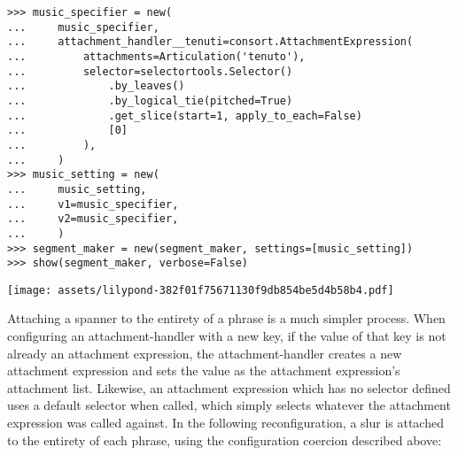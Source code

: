 \begin{comment}
<abjad>[stylesheet=../consort.ily]
music_specifier = new(
    music_specifier,
    attachment_handler__tenuti=consort.AttachmentExpression(
        attachments=Articulation('tenuto'),
        selector=selectortools.Selector()
            .by_leaves()
            .by_logical_tie(pitched=True)
            .get_slice(start=1, apply_to_each=False)
            [0]
        ),
    )
music_setting = new(
    music_setting,
    v1=music_specifier,
    v2=music_specifier,
    )
segment_maker = new(segment_maker, settings=[music_setting])
show(segment_maker, verbose=False)
</abjad>
\end{comment}

\begin{abjadbookoutput}
\begin{singlespacing}
\vspace{-0.5\baselineskip}
\begin{verbatim}
>>> music_specifier = new(
...     music_specifier,
...     attachment_handler__tenuti=consort.AttachmentExpression(
...         attachments=Articulation('tenuto'),
...         selector=selectortools.Selector()
...             .by_leaves()
...             .by_logical_tie(pitched=True)
...             .get_slice(start=1, apply_to_each=False)
...             [0]
...         ),
...     )
>>> music_setting = new(
...     music_setting,
...     v1=music_specifier,
...     v2=music_specifier,
...     )
>>> segment_maker = new(segment_maker, settings=[music_setting])
>>> show(segment_maker, verbose=False)
\end{verbatim}
\noindent\texttt{[image: assets/lilypond-382f01f75671130f9db854be5d4b58b4.pdf]}
\end{singlespacing}
\end{abjadbookoutput}

\noindent Attaching a spanner to the entirety of a phrase is a much simpler
process. When configuring an attachment-handler with a new key, if the value of
that key is not already an attachment expression, the attachment-handler
creates a new attachment expression and sets the value as the attachment
expression's attachment list. Likewise, an attachment expression which has no
selector defined uses a default selector when called, which simply selects
whatever the attachment expression was called against. In the following
reconfiguration, a slur is attached to the entirety of each phrase, using the
configuration coercion described above:

\begin{comment}
<abjad>[stylesheet=../consort.ily]
music_specifier = new(
    music_specifier,
    attachment_handler__slurs=Slur()
    )
music_setting = new(
    music_setting,
    v1=music_specifier,
    v2=music_specifier,
    )
segment_maker = new(segment_maker, settings=[music_setting])
show(segment_maker, verbose=False)
</abjad>
\end{comment}

